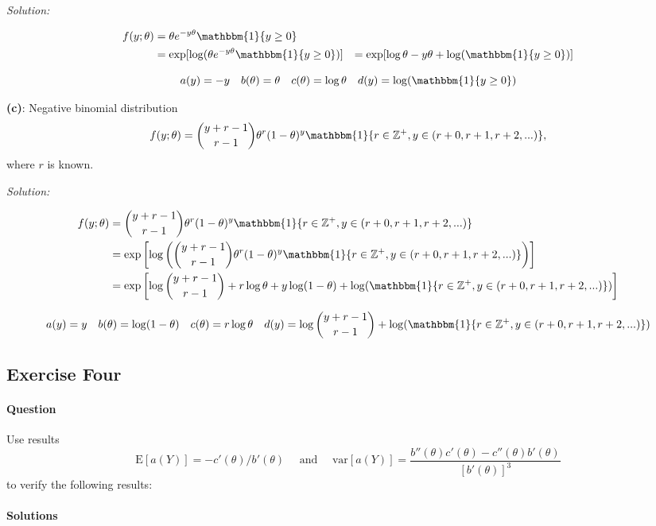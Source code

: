 \documentclass[]{article}
\let\oldparagraph\paragraph
\renewcommand{\paragraph}[1]{\oldparagraph{#1}\mbox{}}
\begin{document}
\emph{Solution: }

\begin{align*}
f(y; \theta) &= \theta e^{-y\theta}\mathbbm{1}\{y \geq 0\}\\
&= \exp[\log(\theta e^{-y\theta}\mathbbm{1}\{y \geq 0\})]
&= \exp[\log\theta - y\theta + \log(\mathbbm{1}\{y \geq 0\})]
\end{align*}

\[a(y) = -y \quad b(\theta) = \theta \quad c(\theta) = \log\theta \quad d(y) = \log(\mathbbm{1}\{y \geq 0\})\]

\textbf{(c)}: Negative binomial distribution
\[f(y; \theta) = \binom{y + r - 1}{r - 1}\theta^r(1-\theta)^y\mathbbm{1}\{r \in \mathbb{Z}^+, y \in (r+0, r+1, r+2, ...)\},\]
where \(r\) is known.

\emph{Solution: }

\begin{align*}
f(y; \theta) &= \binom{y + r - 1}{r - 1}\theta^r(1-\theta)^y\mathbbm{1}\{r \in \mathbb{Z}^+, y \in (r+0, r+1, r+2, ...)\}\\
&= \exp\left[\log\left(\binom{y + r - 1}{r - 1}\theta^r(1-\theta)^y \mathbbm{1}\{r \in \mathbb{Z}^+, y \in (r+0, r+1, r+2, ...)\}    \right)\right]\\
&= \exp\left[\log\binom{y + r - 1}{r - 1} + r\log\theta + y\log(1 - \theta) + \log(\mathbbm{1}\{r \in \mathbb{Z}^+, y \in (r+0, r+1, r+2, ...)\} )    \right]
\end{align*}

\[a(y) = y \quad b(\theta) = \log(1-\theta) \quad c(\theta) = r\log\theta \quad d(y) = \log\binom{y + r - 1}{r - 1} + \log(\mathbbm{1}\{r \in \mathbb{Z}^+, y \in (r+0, r+1, r+2, ...)\} )\]
\pagebreak

\subsection{Exercise Four}\label{exercise-four}

\paragraph{Question}\label{question-2}

Use results \[
\text{E}[a(Y)] = -c'(\theta)/b'(\theta) \quad
\text{ and } \quad
\text{var}[a(Y)] = \dfrac{b''(\theta)c'(\theta) - c''(\theta)b'(\theta)}{[b'(\theta)]^3}
\] to verify the following results:

\paragraph{Solutions}\label{solutions-2}
\end{document}
